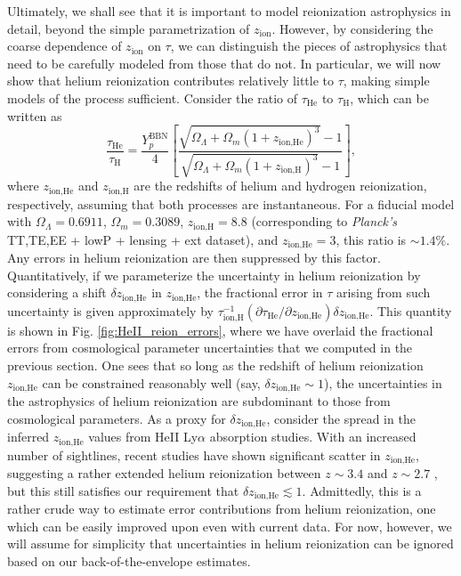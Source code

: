 \documentclass[twocolumn,aps,prd,nofootinbib,showpacs,superscriptaddress]{revtex4-1}
\begin{document}
Ultimately, we shall see that it is important to model reionization astrophysics in detail, beyond the simple parametrization of $z_\textrm{ion}$. However, by considering the coarse dependence of $z_\textrm{ion}$ on $\tau$, we can distinguish the pieces of astrophysics that need to be carefully modeled from those that do not. In particular, we will now show that helium reionization contributes relatively little to $\tau$, making simple models of the process sufficient. Consider the ratio of $\tau_\textrm{He}$ to $\tau_\textrm{H}$, which can be written as
\begin{equation}
\frac{\tau_\textrm{He}}{\tau_\textrm{H}} = \frac{Y_p^\textrm{BBN}}{4} \left[ \frac{ \sqrt{\Omega_\Lambda + \Omega_m (1+z_\textrm{ion,He})^3} - 1}{ \sqrt{\Omega_\Lambda + \Omega_m (1+z_\textrm{ion,H})^3} - 1}\right],
\end{equation}
where $z_\textrm{ion,He}$ and $z_\textrm{ion,H}$ are the redshifts of helium and hydrogen reionization, respectively, assuming that both processes are instantaneous. For a fiducial model with $\Omega_\Lambda = 0.6911$, $\Omega_m = 0.3089$, $z_\textrm{ion,H} = 8.8$ (corresponding to \emph{Planck's} TT,TE,EE + lowP + lensing + ext dataset), and $z_\textrm{ion,He} = 3$, this ratio is $\sim 1.4\%$. Any errors in helium reionization are then suppressed by this factor. Quantitatively, if we parameterize the uncertainty in helium reionization by considering a shift $\delta z_\textrm{ion,He}$ in $z_\textrm{ion,He}$, the fractional error in $\tau$ arising from such uncertainty is given approximately by $\tau_\textrm{ion,H}^{-1} (\partial \tau_\textrm{He} / \partial z_\textrm{ion,He}) \delta z_\textrm{ion,He}$. This quantity is shown in Fig. \ref{fig:HeII_reion_errors}, where we have overlaid the fractional errors from cosmological parameter uncertainties that we computed in the previous section. One sees that so long as the redshift of helium reionization $z_\textrm{ion,He}$ can be constrained reasonably well (say, $ \delta z_\textrm{ion,He} \sim 1$), the uncertainties in the astrophysics of helium reionization are subdominant to those from cosmological parameters. As a proxy for $ \delta z_\textrm{ion,He} $, consider the spread in the inferred $z_\textrm{ion,He}$ values from HeII Ly$\alpha$ absorption studies. With an increased number of sightlines, recent studies have shown significant scatter in $z_\textrm{ion,He}$, suggesting a rather extended helium reionization between $z \sim 3.4$ and $z \sim 2.7$ \cite{worseck_et_al2014}, but this still satisfies our requirement that $ \delta z_\textrm{ion,He} \lesssim 1$. Admittedly, this is a rather crude way to estimate error contributions from helium reionization, one which can be easily improved upon even with current data. For now, however, we will assume for simplicity that uncertainties in helium reionization can be ignored based on our back-of-the-envelope estimates.
\end{document}
